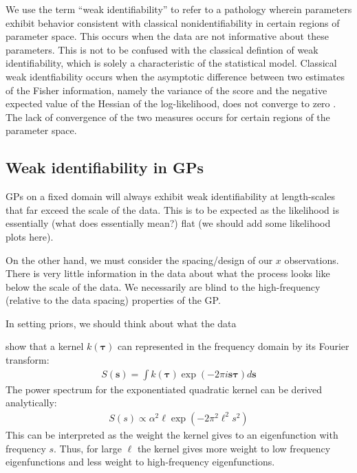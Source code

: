 \documentclass{article}
\begin{document}
We use the term ``weak identifiability'' to refer to a pathology wherein
parameters exhibit behavior consistent with classical nonidentifiability in
certain regions of parameter space. This occurs when the data are not
informative about these parameters.  This is not to be confused with the
classical defintion of weak identifiability, which is solely a characteristic
of the statistical model. Classical weak identfiability occurs when the
asymptotic difference between two estimates of the Fisher information, namely
the variance of the score and the negative expected value of the Hessian of the
log-likelihood, does not converge to zero \cite{andrews2015maximum}. The lack
of convergence of the two measures occurs for certain regions of the parameter
space.

\subsection{Weak identifiability in GPs}




GPs on a fixed domain will always exhibit weak identifiability 
at length-scales that far exceed the scale of the data. This is
to be expected as the likelihood is essentially (what does essentially
mean?) flat (we should add some likelihood plots here). 

On the other hand, we must consider the spacing/design of our $x$ observations.
There is very little information in the data about what the process looks like
below the scale of the data. We necessarily are blind to the high-frequency 
(relative to the data spacing) properties of the GP.

In setting priors, we should think about what the data 

\citet{rasmussen2005gaussian} show that a kernel $k(\boldsymbol{\tau})$ can
represented in the frequency domain by its Fourier transform:
\begin{align*}
  S(\mathbf{s}) = \int k(\mathbf{\tau}) \exp \left( -2 \pi i \mathbf{s}  \boldsymbol{\tau} \right) d\mathbf{s}
\end{align*}
The power spectrum for the exponentiated quadratic kernel can be derived analytically:
\begin{align*} 
  S(s) \propto \alpha^2 \ell
   \exp \left(
  - 2 \pi^2 \ell^2 s^2
\right)
\end{align*} 
This can be interpreted as the weight the kernel gives to an eigenfunction with
frequency $s$. Thus, for large $\ell$ the kernel gives more weight to low
frequency eigenfunctions and less weight to high-frequency eigenfunctions. 
\end{document}
